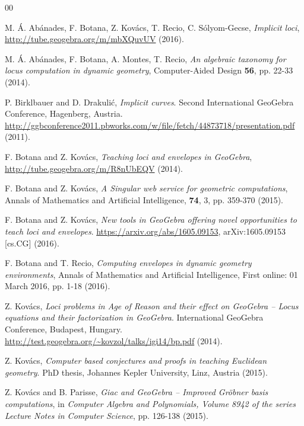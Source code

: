 \documentclass[11pt]{article}
\begin{document}
\begin{thebibliography}{00}
\setlength{\itemsep}{-1mm}
\footnotesize

 M. \'A. Ab\'anades, F. Botana, Z. Kov\'acs, T. Recio, C. S\'olyom-Gecse,
\textit{Implicit loci}, \url{http://tube.geogebra.org/m/mbXQuvUV} (2016).

 M. \'A. Ab\'anades, F. Botana, A. Montes, T. Recio, \textit{An algebraic taxonomy for locus computation in dynamic geometry}, Computer-Aided Design \textbf{56}, pp. 22-33
(2014).

 P. Birklbauer and D. Drakuli\'c, \textit{Implicit curves}. Second International GeoGebra Conference, Hagenberg, Austria.
\url{http://ggbconference2011.pbworks.com/w/file/fetch/44873718/presentation.pdf} (2011).

 F. Botana and Z. Kov\'acs, \textit{Teaching loci and envelopes in GeoGebra},
\url{http://tube.geogebra.org/m/R8nUbEQV} (2014).

 F. Botana and Z. Kov\'acs, \textit{A Singular web service for geometric computations},
Annals of Mathematics and Artificial Intelligence, \textbf{74}, 3, pp. 359-370 (2015).

 F. Botana and Z. Kov\'acs, \textit{New tools in GeoGebra offering novel opportunities to teach loci and envelopes}.
\url{https://arxiv.org/abs/1605.09153}, arXiv:1605.09153 [cs.CG] (2016).

 F. Botana and T. Recio, \textit{Computing envelopes in dynamic geometry environments},
Annals of Mathematics and Artificial Intelligence, First online: 01 March 2016, pp. 1-18 (2016).

 Z. Kov\'acs, \textit{Loci problems in Age of Reason and their effect on GeoGebra -- Locus equations and their factorization in GeoGebra}. International GeoGebra Conference, Budapest, Hungary. \url{http://test.geogebra.org/~kovzol/talks/igi14/bp.pdf} (2014).

 Z. Kov\'acs, \textit{Computer based conjectures and proofs in teaching Euclidean geometry}. PhD thesis, Johannes Kepler University, Linz, Austria (2015).

 Z. Kov\'acs and B. Parisse, \textit{Giac and GeoGebra -- Improved Gr\"obner basis computations}, in \textit{Computer Algebra and Polynomials, Volume 8942 of the series Lecture Notes in Computer Science}, pp. 126-138 (2015). 

\end{thebibliography}
\normalsize
\end{document}
